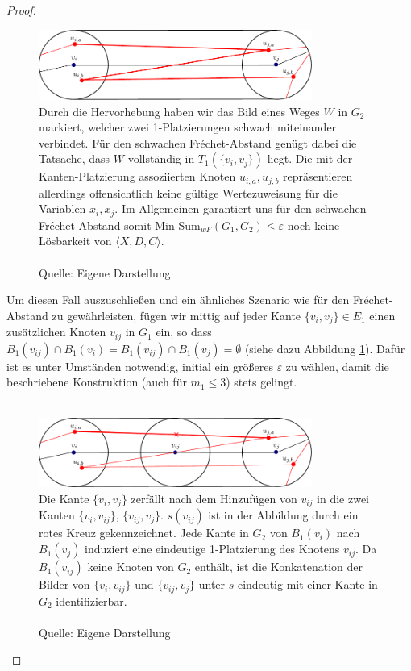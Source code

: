 \documentclass[a4paper, 12pt, twoside]{article}
\theoremstyle{Format1} %
\begin{document}
\begin{proof}
\begin{figure}[H]
    \centering
    \includegraphics[width=0.8\textwidth]{chapter_4_example_0.pdf}
    \caption{Durch die Hervorhebung haben wir das Bild eines Weges $W$ in $G_2$ markiert, welcher zwei 1-Platzierungen schwach miteinander verbindet.
	Für den schwachen Fréchet-Abstand genügt dabei die Tatsache, dass $W$ vollständig in $T_1(\{v_i,v_j\})$ liegt.
	Die mit der Kanten-Platzierung assoziierten Knoten $u_{i,a},u_{j,b}$ repräsentieren allerdings offensichtlich keine gültige Wertezuweisung für die Variablen $x_i,x_j$.
	Im Allgemeinen garantiert uns für den schwachen Fréchet-Abstand somit Min-Sum$_{wF}(G_1,G_2) \leq \varepsilon$ noch keine Lösbarkeit von $\langle X,D,C \rangle$.
	\\
	\\
	Quelle: Eigene Darstellung
	}
\end{figure}

Um diesen Fall auszuschließen und ein ähnliches Szenario wie für den Fréchet-Abstand zu gewährleisten, fügen wir mittig auf jeder Kante $\{v_i, v_j\} \in E_1$
einen zusätzlichen Knoten $v_{ij}$ in $G_1$ ein, so dass $B_1(v_{ij}) \cap B_1(v_i) = B_1(v_{ij}) \cap B_1(v_j) = \emptyset$ (siehe dazu Abbildung \ref{fig:chapter_4_example_1}).
Dafür ist es unter Umständen notwendig, initial ein größeres $\varepsilon$ zu wählen, damit die beschriebene Konstruktion (auch für $m_1 \leq 3$) stets gelingt.
\\
\\
\begin{figure}[H]
    \centering
    \includegraphics[width=0.8\textwidth]{chapter_4_example_1.pdf}
    \caption{
	Die Kante $\{v_i, v_j\}$ zerfällt nach dem Hinzufügen von $v_{ij}$ in die zwei Kanten $\{v_i, v_{ij}\}$, $\{v_{ij},v_j\}$.
	$s(v_{ij})$ ist in der Abbildung durch ein rotes Kreuz gekennzeichnet.
	Jede Kante in $G_2$ von $B_1(v_i)$ nach $B_1(v_j)$ induziert eine eindeutige 1-Platzierung
	des Knotens $v_{ij}$. Da $B_1(v_{ij})$ keine Knoten von $G_2$ enthält, ist die Konkatenation der Bilder von $\{v_i,v_{ij}\}$ und $\{v_{ij},v_j\}$
	unter $s$ eindeutig mit einer Kante in $G_2$ identifizierbar.
	\\
	\\
	Quelle: Eigene Darstellung
	}
    \label{fig:chapter_4_example_1}
\end{figure}


\end{proof}
\end{document}
